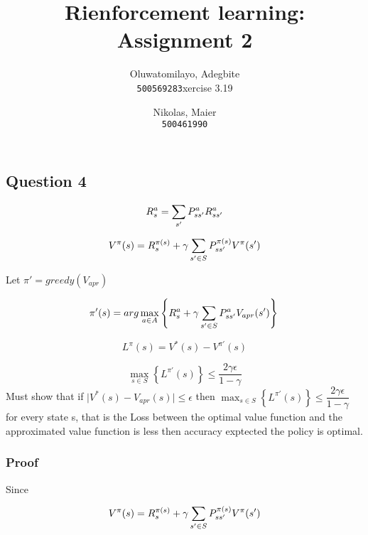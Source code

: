 \documentclass[12pt]{extarticle}
\title{Rienforcement learning: Assignment 2}
\author{
  Oluwatomilayo, Adegbite\\
  \texttt{500569283}xercise 3.19
  \and
  Nikolas, Maier\\
  \texttt{500461990}
}
\newcommand{\<}{\langle}
\renewcommand{\>}{\rangle}
\theoremstyle{definition}
\begin{document}
\maketitle

\section{}

\subsection{Question 4} 

 \begin{equation}
R_s^{a} = \sum_{s'}  P_{s s'}^{a} R_{s s'}^a \\ 
\end{equation} 


 \begin{equation}
V^\pi(s) = R_s^{\pi (s)} + \gamma \sum_{s' \in S}  P_{s s'}^{ \pi (s)} V^\pi(s') \\ 
\end{equation} 

Let $\pi' = greedy(V_{apr})$

 \begin{equation}
\pi'(s) = arg \max_{a \in A} \left\{ R_s^{a} + \gamma \sum_{s' \in S}  P_{s s'}^{a} V_{apr}(s')\right\} \\ 
\end{equation} 

 \begin{equation}
L^\pi(s) = V^*(s) - V^{\pi'}(s)
\end{equation} 

 \begin{equation}
 \max_{s \in S} \left\{ L^{\pi'}(s) \right\} \leq\dfrac{ 2\gamma \epsilon}{1 - \gamma}
\end{equation} 
Must show that if $ \mid V^*(s) - V_{apr}(s) \mid \leq  \epsilon$ then $ \max_{s \in S} \left\{ L^{\pi'}(s) \right\}  \leq \dfrac{ 2\gamma \epsilon}{1 - \gamma}   $ for every state s, that is the Loss between the optimal value function and the approximated value function is less then accuracy exptected the policy is optimal.


\subsubsection{Proof} 
 
Since 

 \begin{equation}
V^\pi(s) = R_s^{\pi (s)} + \gamma \sum_{s' \in S}  P_{s s'}^{ \pi (s)} V^\pi(s') \\ 
\end{equation} 
\end{document}
